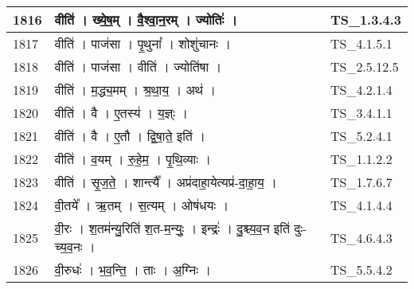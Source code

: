 \documentclass[17pt]{extarticle}
\begin{document}
\begin{longtable}{||p{0.4in}||p{4.9in}||p{0.9in}||}
    \hline
        
    1816 & वीति॑   ।   ख्ये॒ष॒म्   ।   वै॒श्वा॒न॒रम्   ।   ज्योतिः॑   ।    & TS\_1.3.4.3       \\
    
    \hline
        
    1817 & वीति॑   ।   पाज॑सा   ।   पृ॒थुना᳚   ।   शोशु॑चानः   ।    & TS\_4.1.5.1       \\
    
    \hline
        
    1818 & वीति॑   ।   पाज॑सा   ।   वीति॑   ।   ज्योति॑षा   ।    & TS\_2.5.12.5       \\
    
    \hline
        
    1819 & वीति॑   ।   म॒द्ध्य॒मम्   ।   श्र॒था॒य॒   ।   अथ॑   ।    & TS\_4.2.1.4       \\
    
    \hline
        
    1820 & वीति॑   ।   वै   ।   ए॒तस्य॑   ।   य॒ज्ञ्ः   ।    & TS\_3.4.1.1       \\
    
    \hline
        
    1821 & वीति॑   ।   वै   ।   ए॒तौ   ।   द्वि॒षा॒ते॒ इति॑   ।    & TS\_5.2.4.1       \\
    
    \hline
        
    1822 & वीति॑   ।   व॒यम्   ।   रु॒हे॒म॒   ।   पृ॒थि॒व्याः   ।    & TS\_1.1.2.2       \\
    
    \hline
        
    1823 & वीति॑   ।   सृ॒ज॒ते॒   ।   शान्त्यै᳚   ।   अप्र॑दाहा॒येत्यप्र॑{-}दा॒हा॒य॒   ।    & TS\_1.7.6.7       \\
    
    \hline
        
    1824 & वी॒तये᳚   ।   ऋ॒तम्   ।   स॒त्यम्   ।   ओष॑धयः   ।    & TS\_4.1.4.4       \\
    
    \hline
        
    1825 & वी॒रः   ।   श॒तम॑न्यु॒रिति॑ श॒त{-}म॒न्युः॒   ।   इन्द्रः॑   ।   दु॒श्च्य॒व॒न इति॑ दुः{-}च्य॒व॒नः   ।    & TS\_4.6.4.3       \\
    
    \hline
        
    1826 & वी॒रुधः॑   ।   भ॒व॒न्ति॒   ।   ताः   ।   अ॒ग्निः   ।    & TS\_5.5.4.2       \\
    

\end{longtable}
\end{document}
